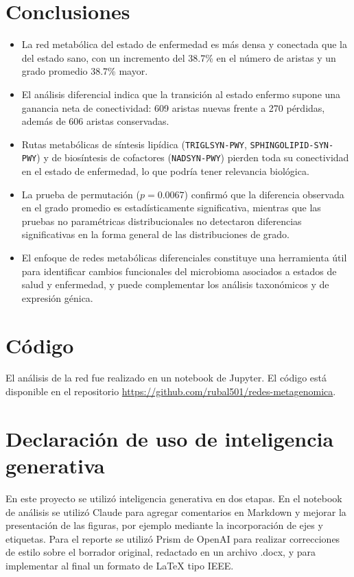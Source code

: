 \documentclass[conference]{IEEEtran}
\begin{document}
\section{Conclusiones}

\begin{itemize}[leftmargin=*]
    \item La red metabólica del estado de enfermedad es más densa y conectada que la del estado sano, con un incremento del 38.7\% en el número de aristas y un grado promedio 38.7\% mayor.
    \item El análisis diferencial indica que la transición al estado enfermo supone una ganancia neta de conectividad: 609 aristas nuevas frente a 270 pérdidas, además de 606 aristas conservadas.
    \item Rutas metabólicas de síntesis lipídica (\nolinkurl{TRIGLSYN-PWY}, \nolinkurl{SPHINGOLIPID-SYN-PWY}) y de biosíntesis de cofactores (\nolinkurl{NADSYN-PWY}) pierden toda su conectividad en el estado de enfermedad, lo que podría tener relevancia biológica.
    \item La prueba de permutación ($p = 0.0067$) confirmó que la diferencia observada en el grado promedio es estadísticamente significativa, mientras que las pruebas no paramétricas distribucionales no detectaron diferencias significativas en la forma general de las distribuciones de grado.
    \item El enfoque de redes metabólicas diferenciales constituye una herramienta útil para identificar cambios funcionales del microbioma asociados a estados de salud y enfermedad, y puede complementar los análisis taxonómicos y de expresión génica.
\end{itemize}

\section{Código}
El análisis de la red fue realizado en un notebook de Jupyter. El código está disponible en el repositorio \url{https://github.com/rubal501/redes-metagenomica}.

\section{Declaración de uso de inteligencia generativa}
En este proyecto se utilizó inteligencia generativa en dos etapas. En el notebook de análisis se utilizó Claude para agregar comentarios en Markdown y mejorar la presentación de las figuras, por ejemplo mediante la incorporación de ejes y etiquetas. Para el reporte se utilizó Prism de OpenAI para realizar correcciones de estilo sobre el borrador original, redactado en un archivo .docx, y para implementar al final un formato de LaTeX tipo IEEE.

\balance


\end{document}
